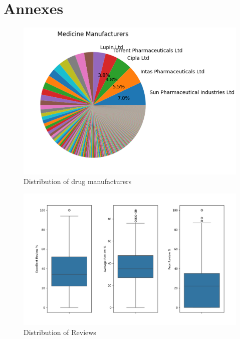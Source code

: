 \documentclass[sigconf]{acmart}
\begin{document}
\section{Annexes}

\begin{figure}[H]
	\centering
	\includegraphics[width=\linewidth]{graphic1.png}
	\caption{Distribution of drug manufacturers}
	\label{fig:uml}
  \end{figure}

\begin{figure}[H]
	\centering
	\includegraphics[width=\linewidth]{graphic2.png}
	\caption{Distribution of Reviews}
	\label{fig:uml}
  \end{figure}
\end{document}
